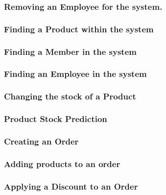 \pagebreak
\subsubsection{Removing an Employee for the system.}
\label{fig:Removing an Employee for the system.}


\pagebreak
\subsubsection{Finding a Product within the system}
\label{fig:Finding a Product within the system}


\pagebreak
\subsubsection{Finding a Member in the system}
\label{fig:Finding a Member in the system}


\pagebreak
\subsubsection{Finding an Employee in the system}
\label{fig:Finding an Employee in the system}


\pagebreak
\subsubsection{Changing the stock of a Product}
\label{fig:Changing the stock of a Product}


\pagebreak
\subsubsection{Product Stock Prediction}
\label{fig:Product Stock Prediction}


\pagebreak
\subsubsection{Creating an Order}
\label{fig:Creating an Order}


\pagebreak
\subsubsection{Adding products to an order}
\label{fig:Adding products to an order}


\pagebreak
\subsubsection{Applying a Discount to an Order}
\label{fig:Applying a Discount to an Order}


